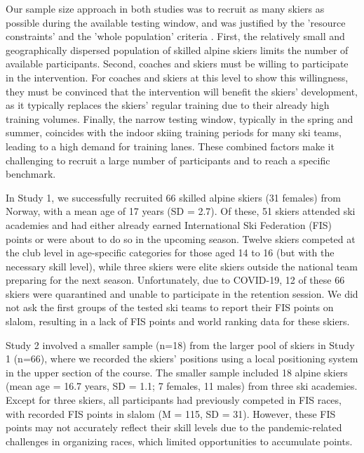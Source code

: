 Our sample size approach in both studies was to recruit as many skiers as possible during the available testing window, and was justified by the 'resource constraints' and the 'whole population' criteria \cite{lakens_sample_2022}. First, the relatively small and geographically dispersed population of skilled alpine skiers limits the number of available participants.  Second, coaches and skiers must be willing to participate in the intervention. For coaches and skiers at this level to show this willingness, they must be convinced that the intervention will benefit the skiers' development, as it typically replaces the skiers' regular training due to their already high training volumes. Finally, the narrow testing window, typically in the spring and summer, coincides with the indoor skiing training periods for many ski teams, leading to a high demand for training lanes. These combined factors make it challenging to recruit a large number of participants and to reach a specific benchmark.  

In Study 1, we successfully recruited 66 skilled alpine skiers (31 females) from Norway, with a mean age of 17 years (SD = 2.7). Of these, 51 skiers attended ski academies and had either already earned International Ski Federation (FIS) points or were about to do so in the upcoming season. Twelve skiers competed at the club level in age-specific categories for those aged 14 to 16 (but with the necessary skill level), while three skiers were elite skiers outside the national team preparing for the next season. Unfortunately, due to COVID-19, 12 of these 66 skiers were quarantined and unable to participate in the retention session. We did not ask the first groups of the tested ski teams to report their FIS points on slalom, resulting in a lack of FIS points and world ranking data for these skiers. 

Study 2 involved a smaller sample (n=18) from the larger pool of skiers in Study 1 (n=66), where we recorded the skiers' positions using a local positioning system in the upper section of the course. The smaller sample included 18 alpine skiers (mean age = 16.7 years, SD = 1.1; 7 females, 11 males) from three ski academies. Except for three skiers, all participants had previously competed in FIS races, with recorded FIS points in slalom (M = 115, SD = 31). However, these FIS points may not accurately reflect their skill levels due to the pandemic-related challenges in organizing races, which limited opportunities to accumulate points.

